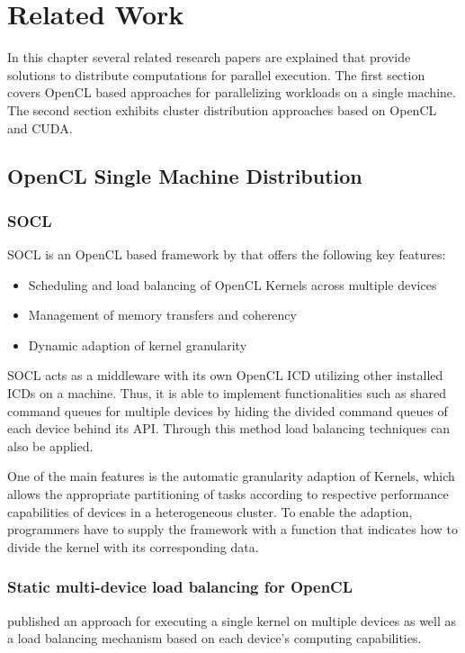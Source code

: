 \chapter{Related Work}
\label{related}
In this chapter several related research papers are explained that provide solutions to distribute computations for parallel execution. The first section covers OpenCL based approaches for parallelizing workloads on a single machine. The second section exhibits cluster distribution approaches based on OpenCL and CUDA.

\section{OpenCL Single Machine Distribution}

\subsection*{SOCL}
SOCL is an OpenCL based framework by \citeauthor{socl} that offers the following key features\cite{socl}:
\begin{itemize}
    \item Scheduling and load balancing of OpenCL Kernels across multiple devices
    \item Management of memory transfers and coherency
    \item Dynamic adaption of kernel granularity
\end{itemize}

SOCL acts as a middleware with its own OpenCL ICD utilizing other installed ICDs on a machine. Thus, it is able to implement functionalities such as shared command queues for multiple devices by hiding the divided command queues of each device behind its API. Through this method load balancing techniques can also be applied.

One of the main features is the automatic granularity adaption of Kernels, which allows the appropriate partitioning of tasks according to respective performance capabilities of devices in a heterogeneous cluster. To enable the adaption, programmers have to supply the framework with a function that indicates how to divide the kernel with its corresponding data.

\subsection*{Static multi-device load balancing for OpenCL}
\citeauthor{delalama_2012} published an approach for executing a single kernel on multiple devices as well as a load balancing mechanism based on each device's computing capabilities\cite{delalama_2012}.

